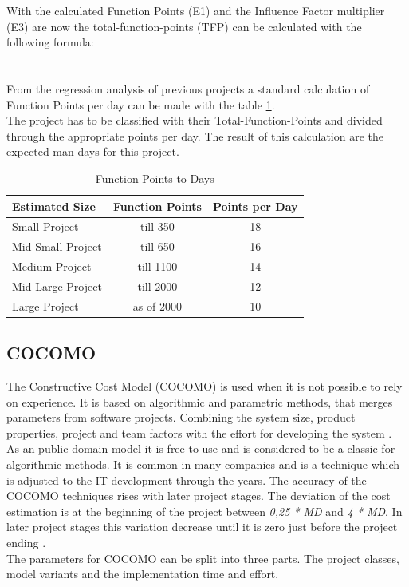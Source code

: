 With the calculated Function Points (E1) and the Influence Factor multiplier (E3) are now the total-function-points (TFP) can be calculated with the following formula:\\
\\
\\
From the regression analysis of previous projects a standard calculation of Function Points per day can be made with the table \ref{tab:pointsperday}.\\
The project has to be classified with their Total-Function-Points and divided through the appropriate points per day. The result of this calculation are the expected man days for this project.\\
\begin{table}[h] 
	\centering 
	\setlength{\tabcolsep}{4pt}
	\begin{tabular}{|l||c|c|}\hline
		Estimated Size    & Function Points & Points per Day\\ \hline\hline
		Small Project     & till 350        & 18 \\ \hline
		Mid Small Project & till 650        & 16 \\ \hline
		Medium Project    & till 1100 		& 14 \\ \hline
		Mid Large Project & till 2000 		& 12\\ \hline
		Large Project     & as of 2000 		& 10 \\ \hline
	\end{tabular}
	\caption{Function Points to Days} 
	\label{tab:pointsperday} 
\end{table} 

\subsection{COCOMO} \label{COCOMOMethod}

The Constructive Cost Model (COCOMO) is used when it is not possible to rely on experience. It is based on algorithmic and parametric methods, that merges parameters from software projects. Combining the system size, product properties, project and team factors with the effort for developing the system \cite{jenny}.\\
As an public domain model it is free to use and is considered to be a classic for algorithmic methods. It is common in many companies and is a technique which is adjusted to the IT development through the years.
The accuracy of the COCOMO techniques rises with later project stages. The deviation of the cost estimation is at the beginning of the project between \textit{0,25 * MD} and \textit{4 * MD}. In later project stages this variation decrease until it is zero just before the project ending \cite{sommerville}.\\
The parameters for COCOMO can be split into three parts. The project classes, model variants and the implementation time and effort.

